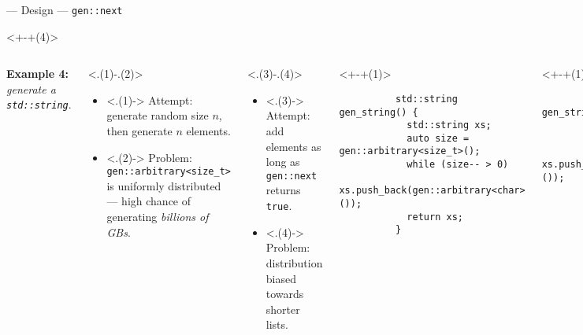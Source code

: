 \begin{frame}[fragile,t]{\halcheck{} --- Design --- \texttt{gen::next}}
  \begin{onlyenv}<+-+(4)>
    \begin{columns}[T]
      \textbf{Example 4:} \emph{generate a \texttt{std::string}}.

      \begin{onlyenv}<.(1)-.(2)>
        \begin{itemize}
          \item<.(1)-> Attempt: generate random size $n$, then generate $n$ elements.
          \item<.(2)-> Problem: \texttt{gen::arbitrary<size_t>} is uniformly distributed --- high chance of generating \emph{billions of GBs}.
        \end{itemize}
      \end{onlyenv}

      \begin{onlyenv}<.(3)-.(4)>
        \begin{itemize}
          \item<.(3)-> Attempt: add elements as long as \texttt{gen::next} returns \texttt{true}.
          \item<.(4)-> Problem: distribution biased towards shorter lists.
        \end{itemize}
      \end{onlyenv}

      \begin{onlyenv}<+-+(1)>
        \begin{verbatim}
          std::string gen_string() {
            std::string xs;
            auto size = gen::arbitrary<size_t>();
            while (size-- > 0)
              xs.push_back(gen::arbitrary<char>());
            return xs;
          }
        \end{verbatim}
        \only<+>{}
      \end{onlyenv}

      \begin{onlyenv}<+-+(1)>
        \begin{verbatim}
          std::string gen_string() {
            std::string xs;
            while (gen::next())
              xs.push_back(gen::arbitrary<char>());
            return xs;
          }
        \end{verbatim}
        \only<+>{}
      \end{onlyenv}

    \end{columns}
  \end{onlyenv}
\end{frame}

